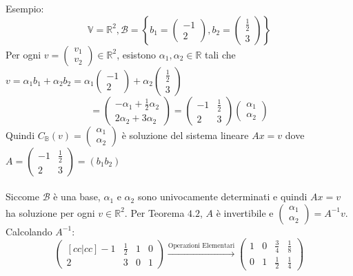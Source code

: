 \documentclass[12pt]{article}
\begin{document}
Esempio:
\[\mathbb{V} = \mathbb{R}^2, \mathcal{B} = \left\{b_1 = \begin{pmatrix}
    -1\\
    2
\end{pmatrix}, b_2 = \begin{pmatrix}
    \frac{1}{2}\\
    3
\end{pmatrix}\right\}\]
Per ogni $v = \begin{pmatrix}
    v_1\\
    v_2
\end{pmatrix} \in \mathbb{R}^2$, esistono $\alpha_1, \alpha_2 \in \mathbb{R}$ tali che $v = \alpha_1b_1 + \alpha_2b_2 = \alpha_1 \begin{pmatrix}
    -1\\
    2
\end{pmatrix} + \alpha_2 \begin{pmatrix}
    \frac{1}{2}\\
    3
\end{pmatrix}$
\[= \begin{pmatrix}
    -\alpha_1 + \frac{1}{2}\alpha_2\\
    2\alpha_2 + 3\alpha_2
\end{pmatrix} = \begin{pmatrix}
    -1  & \frac{1}{2}\\
    2 & 3
\end{pmatrix} \begin{pmatrix}
    \alpha_1\\
    \alpha_2
\end{pmatrix}\]
Quindi $C_{\mathbb{B}}(v) = \begin{pmatrix}
    \alpha_1\\
    \alpha_2
\end{pmatrix}$ è soluzione del sistema lineare $Ax = v$ dove $A = \begin{pmatrix}
    -1 & \frac{1}{2}\\
    2 & 3
\end{pmatrix} = (b_1 b_2)$
\\\\
Siccome $\mathcal{B}$ è una base, $\alpha_1$ e $\alpha_2$ sono univocamente determinati e quindi $Ax = v$ ha soluzione per ogni $v \in \mathbb{R}^2$. Per Teorema $4.2$, $A$ è invertibile e $\begin{pmatrix}
    \alpha_1\\
    \alpha_2
\end{pmatrix} = A^{-1}v$. Calcolando $A^{-1}$:
\[\begin{pmatrix}[cc|cc]
    -1 & \frac{1}{2} & 1 & 0\\
    2 & 3 & 0 & 1
\end{pmatrix} \stackrel{\text{Operazioni Elementari}}{\longrightarrow} \begin{pmatrix}
    1 & 0 & \frac{3}{4} & \frac{1}{8}\\
    0 & 1 & \frac{1}{2} & \frac{1}{4}
\end{pmatrix}\]
\end{document}
